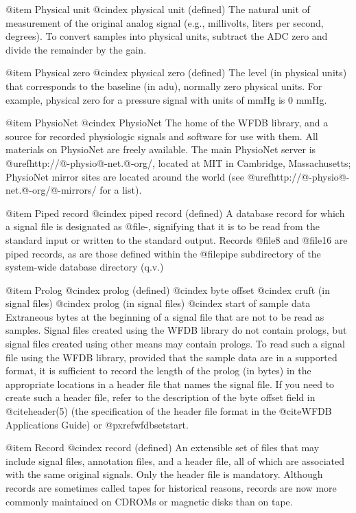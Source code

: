 {{{{{{{{@item Physical unit
@cindex physical unit (defined)
The natural unit of measurement of the original analog signal (e.g.,
millivolts, liters per second, degrees).  To convert samples into
physical units, subtract the ADC zero and divide the remainder by the
gain.

@item Physical zero
@cindex physical zero (defined)
The level (in physical units) that corresponds to the baseline (in adu),
normally zero physical units.  For example, physical zero for a pressure
signal with units of mmHg is 0 mmHg.

@item PhysioNet
@cindex PhysioNet
The home of the WFDB library, and a source for recorded physiologic signals and
software for use with them.  All materials on PhysioNet are freely available.
The main PhysioNet server is @uref{http://@-physio@-net.@-org/}, located at
MIT in Cambridge, Massachusetts; PhysioNet mirror sites are located around the
world (see @uref{http://@-physio@-net.@-org/@-mirrors/} for a list).

@item Piped record
@cindex piped record (defined)
A database record for which a signal file is designated as @file{-},
signifying that it is to be read from the standard input or written to
the standard output.  Records @file{8} and @file{16} are piped
records, as are those defined within the @file{pipe} subdirectory of
the system-wide database directory (q.v.)

@item Prolog
@cindex prolog (defined)
@cindex byte offset
@cindex cruft (in signal files)
@cindex prolog (in signal files)
@cindex start of sample data
Extraneous bytes at the beginning of a signal file that are not to be
read as samples.  Signal files created using the WFDB library do not
contain prologs, but signal files created using other means may contain
prologs.  To read such a signal file using the WFDB library, provided that
the sample data are in a supported format, it is sufficient to record the
length of the prolog (in bytes) in the appropriate locations in a
header file that names the signal file.  If you need to create
such a header file, refer to the description of the byte offset
field in @cite{header(5)} (the specification of the header file
format in the @cite{WFDB Applications Guide}) or
@pxref{wfdbsetstart}.

@item Record
@cindex record (defined)
An extensible set of files that may include signal files, annotation
files, and a header file, all of which are associated with the
same original signals.  Only the header file is mandatory.
Although records are sometimes called tapes for historical reasons,
records are now more commonly maintained on CDROMs or magnetic disks
than on tape.

}}}}}}}}
